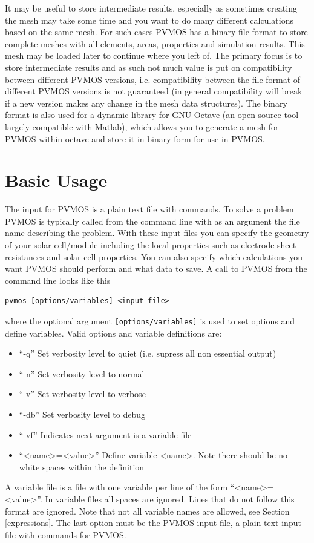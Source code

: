 \documentclass[noshowpacs,preprintnumbers,amsmath,amssymb, letter]{revtex4}
\begin{document}
It may be useful to store intermediate results, especially as sometimes creating the mesh may take some time and you want to do many different calculations based on the same mesh. For such cases PVMOS has a binary file format to store complete meshes with all elements, areas, properties and simulation results. This mesh may be loaded later to continue where you left of. The primary focus is to store intermediate results and as such not much value is put on compatibility between different PVMOS versions, i.e. compatibility between the file format of different PVMOS versions is not guaranteed (in general compatibility will break if a new version makes any change in the mesh data structures). The binary format is also used for a dynamic library for GNU Octave (an open source tool largely compatible with Matlab), which allows you to generate a mesh for PVMOS within octave and store it in binary form for use in PVMOS. 

\section{Basic Usage}
The input for PVMOS is a plain text file with commands. To solve a problem PVMOS is typically called from the command line with as an argument the file name describing the problem. With these input files you can specify the geometry of your solar cell/module including the local properties such as electrode sheet resistances and solar cell properties. You can also specify which calculations you want PVMOS should perform and what data to save. A call to PVMOS from the command line looks like this
\begin{verbatim}
pvmos [options/variables] <input-file>
\end{verbatim}
where the optional argument \texttt{[options/variables]} is used to set options and define variables. Valid options and variable definitions are:
\begin{itemize}
\item{``-q''} Set verbosity level to quiet (i.e. supress all non essential output)
\item{``-n''} Set verbosity level to normal 
\item{``-v''} Set verbosity level to verbose
\item{``-db''} Set verbosity level to debug
\item{``-vf''} Indicates next argument is a variable file
\item{``\textless name\textgreater=\textless value\textgreater''} Define variable \textless name\textgreater. Note there should be no white spaces within the definition
\end{itemize}
A variable file is a file with one variable per line of the form ``\textless name\textgreater=\textless value\textgreater''. In variable files all spaces are ignored. Lines that do not follow this format are ignored. Note that not all variable names are allowed, see Section \ref{expressions}. The last option must be the PVMOS input file, a plain text input file with commands for PVMOS.
\end{document}
